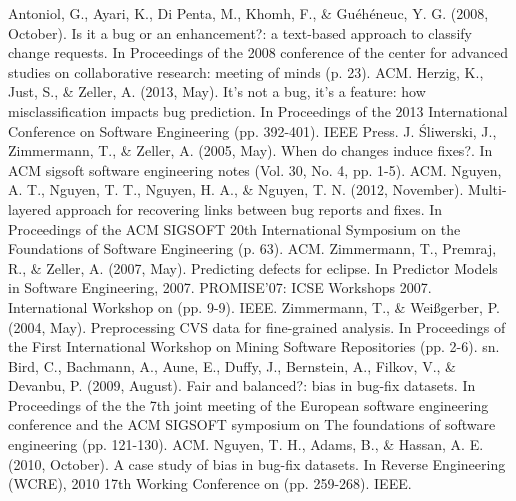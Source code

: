 \documentclass[runningheads,a4paper]{llncs}
\begin{document}


\begin{thebibliography}{4}

Antoniol, G., Ayari, K., Di Penta, M., Khomh, F., \& Gu\'eh\'eneuc, Y. G. (2008, October). Is it a bug or an enhancement?: a text-based approach to classify change requests. In Proceedings of the 2008 conference of the center for advanced studies on collaborative research: meeting of minds (p. 23). ACM.
Herzig, K., Just, S., \& Zeller, A. (2013, May). It's not a bug, it's a feature: how misclassification impacts bug prediction. In Proceedings of the 2013 International Conference on Software Engineering (pp. 392-401). IEEE Press.
J. Śliwerski, J., Zimmermann, T., \& Zeller, A. (2005, May). When do changes induce fixes?. In ACM sigsoft software engineering notes (Vol. 30, No. 4, pp. 1-5). ACM.
Nguyen, A. T., Nguyen, T. T., Nguyen, H. A., \& Nguyen, T. N. (2012, November). Multi-layered approach for recovering links between bug reports and fixes. In Proceedings of the ACM SIGSOFT 20th International Symposium on the Foundations of Software Engineering (p. 63). ACM.
Zimmermann, T., Premraj, R., \& Zeller, A. (2007, May). Predicting defects for eclipse. In Predictor Models in Software Engineering, 2007. PROMISE'07: ICSE Workshops 2007. International Workshop on (pp. 9-9). IEEE.
Zimmermann, T., \& Weißgerber, P. (2004, May). Preprocessing CVS data for fine-grained analysis. In Proceedings of the First International Workshop on Mining Software Repositories (pp. 2-6). sn.
Bird, C., Bachmann, A., Aune, E., Duffy, J., Bernstein, A., Filkov, V., \& Devanbu, P. (2009, August). Fair and balanced?: bias in bug-fix datasets. In Proceedings of the the 7th joint meeting of the European software engineering conference and the ACM SIGSOFT symposium on The foundations of software engineering (pp. 121-130). ACM.
Nguyen, T. H., Adams, B., \& Hassan, A. E. (2010, October). A case study of bias in bug-fix datasets. In Reverse Engineering (WCRE), 2010 17th Working Conference on (pp. 259-268). IEEE.
\end{thebibliography}
\end{document}
